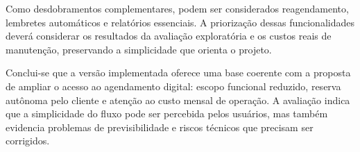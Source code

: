Como desdobramentos complementares, podem ser considerados reagendamento, lembretes automáticos e relatórios essenciais. A priorização dessas funcionalidades deverá considerar os resultados da avaliação exploratória e os custos reais de manutenção, preservando a simplicidade que orienta o projeto.

Conclui-se que a versão implementada oferece uma base coerente com a proposta de ampliar o acesso ao agendamento digital: escopo funcional reduzido, reserva autônoma pelo cliente e atenção ao custo mensal de operação. A avaliação indica que a simplicidade do fluxo pode ser percebida pelos usuários, mas também evidencia problemas de previsibilidade e riscos técnicos que precisam ser corrigidos.
